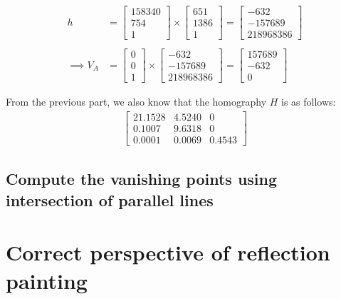 \documentclass[12pt, oneside]{article}
\begin{document}
\begin{align*}
h   &=  \begin{bmatrix} 158340  \\ 754 \\ 1  \end{bmatrix} \times 
        \begin{bmatrix} 651   \\ 1386 \\   1   \end{bmatrix} 
    =  \begin{bmatrix} -632   \\ -157689   \\ 218968386   \end{bmatrix}  \\ \\   
\implies V_A  &=  \begin{bmatrix} 0   \\ 0   \\ 1   \end{bmatrix} \times
        \begin{bmatrix} -632   \\ -157689   \\ 218968386   \end{bmatrix} 
    =  \begin{bmatrix} 157689   \\ -632   \\ 0   \end{bmatrix} 
\end{align*}

From the previous part, we also know that the homography $H$ is as follows:
\begin{align*}
\begin{bmatrix}
    21.1528     &   4.5240  & 0 \\
    0.1007       &   9.6318   & 0 \\
    0.0001       &   0.0069 & 0.4543
\end{bmatrix}
\end{align*}

\subsection{Compute the vanishing points using intersection of parallel lines}

\clearpage
\section{Correct perspective of reflection painting}
\end{document}

